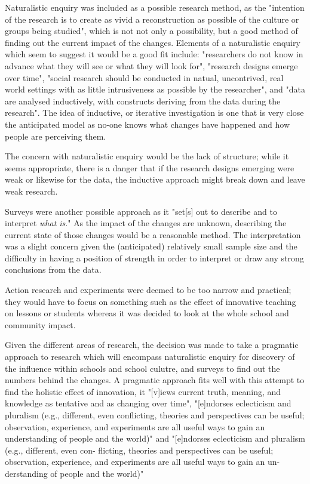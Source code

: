 Naturalistic enquiry was included as a possible research method, as the "intention of the research is to create as vivid a reconstruction as possible of the culture or groups being studied", \cite{Cohen2005} which is not not only a possibility, but a good method of finding out the current impact of the changes. Elements of a naturalistic enquiry which seem to suggest it would be a good fit include: "researchers do not know in advance what they will see or what they will look for", "research designs emerge over time", "social research should be conducted in natual, uncontrived, real world settings with as little intrusiveness as possible by the researcher", and "data are analysed inductively, with constructs deriving from the data during the research". The idea of inductive, or iterative investigation is one that is very close the anticipated model as no-one knows what changes have happened and how people are perceiving them. 

The concern with naturalistic enquiry would be the lack of structure; while it seems appropriate, there is a danger that if the research designs emerging were weak or likewise for the data, the inductive approach might break down and leave weak research.

Surveys were another possible approach as it "set[s] out to describe and to interpret \textit{what is}." \cite[p. 169]{Cohen2005} As the impact of the changes are unknown, describing the current state of those changes would be a reasonable method. The interpretation was a slight concern given the (anticipated) relatively small sample size and the difficulty in having a position of strength in order to interpret or draw any strong conclusions from the data.

Action research and experiments were deemed to be too narrow and practical; they would have to focus on something such as the effect of innovative teaching on lessons or students whereas it was decided to look at the whole school and community impact.

Given the different areas of research, the decision was made to take a pragmatic approach to research which will encompass naturalistic enquiry for discovery of the influence within schools and school culutre, and surveys to find out the numbers behind the changes.  A pragmatic approach fits well with this attempt to find the holistic effect of innovation, it "[v]iews current truth, meaning, and knowledge as tentative and as changing over time",  \cite[p. 18]{Johnson_2004} "[e]ndorses eclecticism and pluralism (e.g., different, even conflicting, theories and perspectives can be useful; observation, experience, and experiments are all useful ways to gain an understanding of people and the world)" \cite[p. 18]{Johnson_2004}  and "[e]ndorses eclecticism and pluralism (e.g., different, even con- flicting, theories and perspectives can be useful; observation, experience, and experiments are all useful ways to gain an un- derstanding of people and the world)" \cite[p. 18]{Johnson_2004} 

